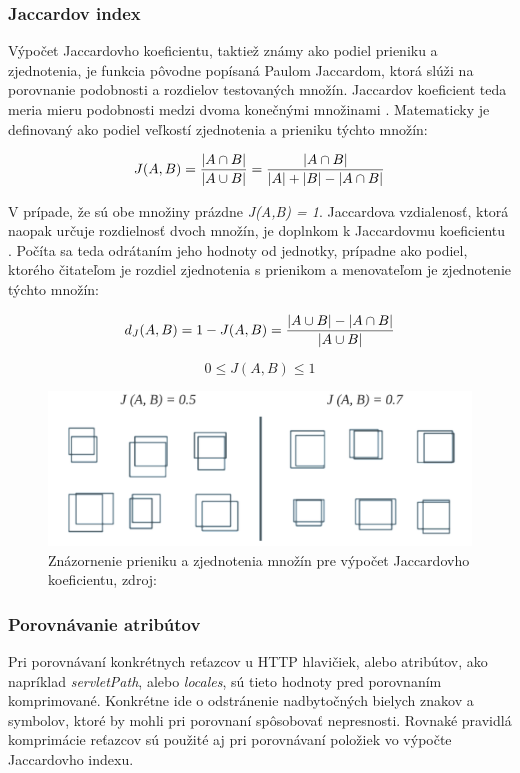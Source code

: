 \documentclass[
  digital, %
  oneside, %
  table,   %
  lof,     %
  nolot,   %
  nocover
]{fithesis3}
\begin{document}
\subsubsection{\bf{Jaccardov index}}
Výpočet Jaccardovho koeficientu, taktiež známy ako podiel prieniku a 
zjednotenia, je funkcia pôvodne popísaná Paulom Jaccardom, ktorá slúži na
porovnanie podobnosti a rozdielov testovaných množín. Jaccardov koeficient teda
meria mieru podobnosti medzi dvoma konečnými množinami \cite{Zezula:2006:SS}. Matematicky je
definovaný ako podiel veľkostí zjednotenia a prieniku týchto množín:

\begin{equation}
 J(A,B) = {{|A \cap B|}\over{|A \cup B|}} = {{|A \cap B|}\over{|A| + |B| - |A \cap B|}}
\end{equation}

V prípade, že sú obe množiny prázdne \textit{J(A,B) = 1}.
Jaccardova vzdialenosť, ktorá naopak určuje rozdielnosť dvoch množín, je
doplnkom k Jaccardovmu koeficientu \cite{Zezula:2006:SS,Kosub:2016:SS}. Počíta sa teda odrátaním jeho hodnoty od
jednotky, prípadne ako podiel, ktorého čitateľom je rozdiel zjednotenia s
prienikom a menovateľom je zjednotenie týchto množín:

\begin{equation}
 d_J(A,B) = 1 - J(A,B) = { { |A \cup B| - |A \cap B| } \over |A \cup B| }
\end{equation}

\begin{equation}
 0\le J(A,B)\le 1
\end{equation}

\begin{figure}[t]
  \centering
    \includegraphics[width=.99\textwidth]{images/footprint-jacc-sets.png}
  \caption{Znázornenie prieniku a zjednotenia množín pre výpočet Jaccardovho
  koeficientu, zdroj: \cite{Zitnick:2014:SS}}
  \label{fig:footprint-jacc-sets}
\end{figure}

\subsubsection{\bf{Porovnávanie atribútov}}
Pri porovnávaní konkrétnych reťazcov u HTTP hlavičiek, alebo atribútov, ako
napríklad \textit{servletPath}, alebo \textit{locales}, sú tieto hodnoty pred
porovnaním komprimované. Konkrétne ide o odstránenie nadbytočných bielych
znakov a symbolov, ktoré by mohli pri porovnaní spôsobovať nepresnosti. Rovnaké
pravidlá komprimácie reťazcov sú použité aj pri porovnávaní položiek vo výpočte Jaccardovho indexu.
\end{document}
